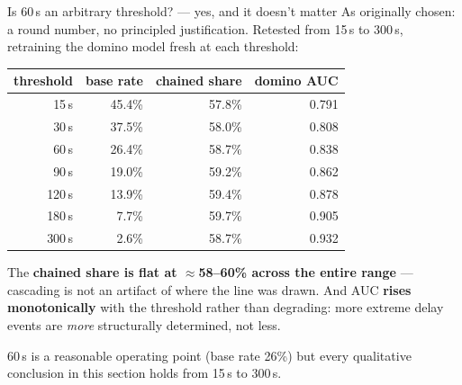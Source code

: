 \documentclass[aspectratio=169,10pt]{beamer}
\newcommand{\hl}[1]{{\color{corange}\textbf{#1}}}
\begin{document}
\begin{frame}{Is 60\,s an arbitrary threshold? --- yes, and it doesn't matter}
  As originally chosen: a round number, no principled justification. Retested from
  15\,s to 300\,s, retraining the domino model fresh at each threshold:

  \vspace{0.5em}
  \centering
  \begin{tabular}{@{}rrrr@{}}
    \toprule
    threshold & base rate & chained share & domino AUC \\
    \midrule
    15\,s & 45.4\% & 57.8\% & 0.791 \\
    30\,s & 37.5\% & 58.0\% & 0.808 \\
    60\,s & 26.4\% & 58.7\% & 0.838 \\
    90\,s & 19.0\% & 59.2\% & 0.862 \\
    120\,s & 13.9\% & 59.4\% & 0.878 \\
    180\,s & 7.7\% & 59.7\% & 0.905 \\
    300\,s & 2.6\% & 58.7\% & 0.932 \\
    \bottomrule
  \end{tabular}

  \vspace{0.7em}
  \raggedright
  The \textbf{chained share is flat at $\approx$58--60\% across the entire range}
  --- cascading is not an artifact of where the line was drawn. And AUC
  \hl{rises monotonically} with the threshold rather than degrading: more extreme
  delay events are \emph{more} structurally determined, not less.

  \vspace{0.3em}
  60\,s is a reasonable operating point (base rate 26\%) but every qualitative
  conclusion in this section holds from 15\,s to 300\,s.
\end{frame}
\end{document}
